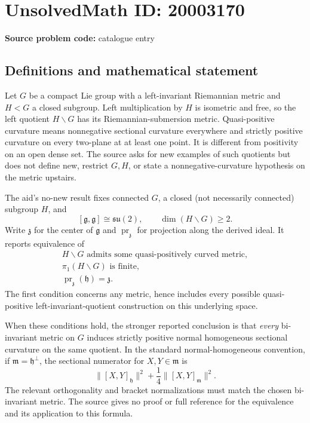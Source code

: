 \documentclass[11pt]{article}
\begin{document}
\section*{UnsolvedMath ID: 20003170}
\textbf{Source problem code:} catalogue entry
\subsection{Definitions and mathematical statement}
Let $G$ be a compact Lie group with a left-invariant Riemannian metric and $H<G$ a closed subgroup. Left multiplication by $H$ is isometric and free, so the left quotient $H\backslash G$ has its Riemannian-submersion metric. Quasi-positive curvature means nonnegative sectional curvature everywhere and strictly positive curvature on every two-plane at at least one point. It is different from positivity on an open dense set. The source asks for new examples of such quotients but does not define new, restrict $G,H$, or state a nonnegative-curvature hypothesis on the metric upstairs.

The aid's no-new result fixes connected $G$, a closed (not necessarily connected) subgroup $H$, and
\[
 [\mathfrak g,\mathfrak g]\cong\mathfrak{su}(2),\qquad
 \dim(H\backslash G)\geq2.
\]
Write $\mathfrak z$ for the center of $\mathfrak g$ and $\operatorname{pr}_{\mathfrak z}$ for projection along the derived ideal. It reports equivalence of
\[
 \begin{gathered}
 H\backslash G\text{ admits some quasi-positively curved metric},\\
 \pi_1(H\backslash G)\text{ is finite},\\
 \operatorname{pr}_{\mathfrak z}(\mathfrak h)=\mathfrak z.
 \end{gathered}
\]
The first condition concerns any metric, hence includes every possible quasi-positive left-invariant-quotient construction on this underlying space.

When these conditions hold, the stronger reported conclusion is that \emph{every} bi-invariant metric on $G$ induces strictly positive normal homogeneous sectional curvature on the same quotient. In the standard normal-homogeneous convention, if $\mathfrak m=\mathfrak h^\perp$, the sectional numerator for $X,Y\in\mathfrak m$ is
\[
 \|[X,Y]_{\mathfrak h}\|^2+
 \frac14\|[X,Y]_{\mathfrak m}\|^2.
\]
The relevant orthogonality and bracket normalizations must match the chosen bi-invariant metric. The source gives no proof or full reference for the equivalence and its application to this formula.
\end{document}
